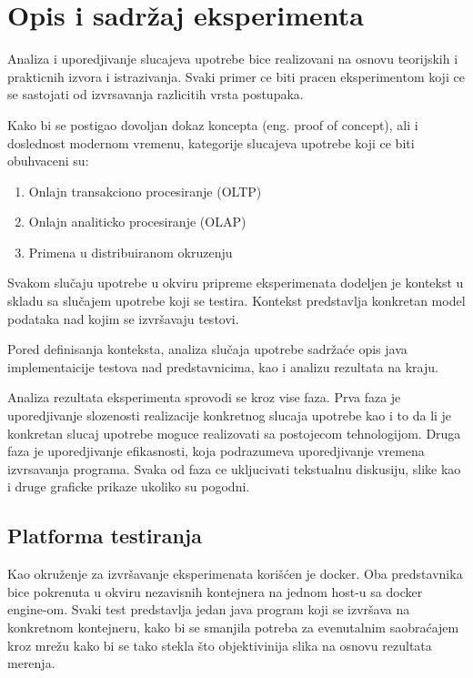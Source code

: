 \documentclass[12pt,oneside]{memoir}
\begin{document}
\section{Opis i sadržaj eksperimenta}
Analiza i uporedjivanje slucajeva upotrebe bice realizovani na osnovu teorijskih i prakticnih  izvora i istrazivanja. Svaki primer ce biti pracen eksperimentom koji ce se sastojati od izvrsavanja razlicitih vrsta postupaka.

Kako bi se postigao dovoljan dokaz koncepta (eng. proof of concept), ali i doslednost modernom
vremenu, kategorije slucajeva upotrebe koji ce biti obuhvaceni su:
\begin{enumerate}
\item Onlajn transakciono procesiranje (OLTP)
\item Onlajn analiticko procesiranje (OLAP)
\item Primena u distribuiranom okruzenju
\end{enumerate}

Svakom slučaju upotrebe u okviru pripreme eksperimenata dodeljen je kontekst u skladu sa slučajem upotrebe koji se testira.  Kontekst predstavlja konkretan model podataka nad kojim se izvršavaju testovi.

Pored definisanja konteksta, analiza slučaja upotrebe sadržaće opis java implementaicije testova nad predstavnicima, kao i analizu rezultata na kraju.

Analiza rezultata eksperimenta sprovodi se kroz vise faza. Prva faza je uporedjivanje slozenosti realizacije konkretnog slucaja upotrebe kao i to da li je konkretan slucaj upotrebe moguce realizovati sa postojecom tehnologijom. Druga faza je uporedjivanje efikasnosti, koja podrazumeva uporedjivanje vremena izvrsavanja programa.  Svaka od faza ce ukljucivati tekstualnu diskusiju, slike kao i druge graficke prikaze ukoliko su pogodni.

\subsection{Platforma testiranja}

Kao okruženje za izvršavanje eksperimenata korišćen je docker.  Oba predstavnika bice pokrenuta u okviru nezavisnih kontejnera na jednom host-u sa docker engine-om. Svaki test predstavlja jedan java program koji se izvršava na konkretnom kontejneru, kako bi se smanjila potreba za evenutalnim saobraćajem kroz mrežu kako bi se tako stekla što objektivinija slika na osnovu rezultata merenja.
\end{document}

